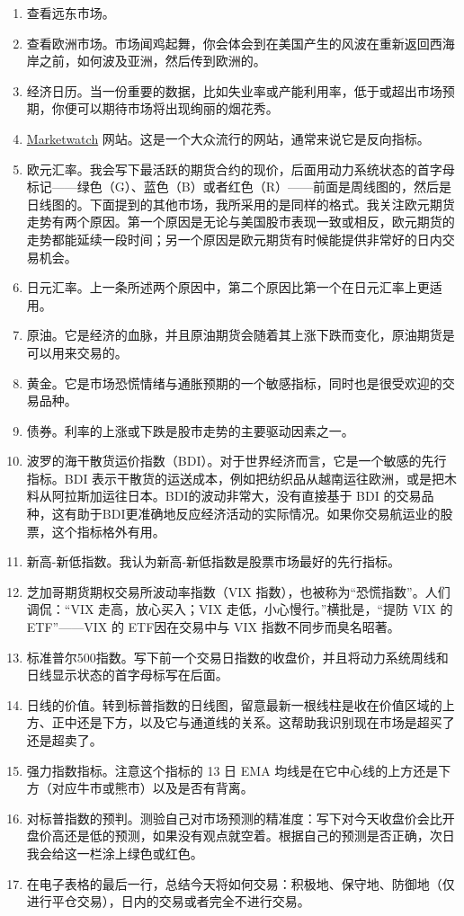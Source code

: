 \begin{enumerate}
    \item 查看远东市场。
    \item 查看欧洲市场。市场闻鸡起舞，你会体会到在美国产生的风波在重新返回西海岸之前，如何波及亚洲，然后传到欧洲的。
    \item 经济日历。当一份重要的数据，比如失业率或产能利用率，低于或超出市场预期，你便可以期待市场将出现绚丽的烟花秀。
    \item \href{https://www.marketwatch.com/}{Marketwatch} 网站。这是一个大众流行的网站，通常来说它是反向指标。
    \item 欧元汇率。我会写下最活跃的期货合约的现价，后面用动力系统状态的首字母标记——绿色（G）、蓝色（B）或者红色（R）——前面是周线图的，然后是日线图的。下面提到的其他市场，我所采用的是同样的格式。我关注欧元期货走势有两个原因。第一个原因是无论与美国股市表现一致或相反，欧元期货的走势都能延续一段时间；另一个原因是欧元期货有时候能提供非常好的日内交易机会。
    \item 日元汇率。上一条所述两个原因中，第二个原因比第一个在日元汇率上更适用。
    \item 原油。它是经济的血脉，并且原油期货会随着其上涨下跌而变化，原油期货是可以用来交易的。
    \item 黄金。它是市场恐慌情绪与通胀预期的一个敏感指标，同时也是很受欢迎的交易品种。
    \item 债券。利率的上涨或下跌是股市走势的主要驱动因素之一。
    \item 波罗的海干散货运价指数（BDI）。对于世界经济而言，它是一个敏感的先行指标。BDI 表示干散货的运送成本，例如把纺织品从越南运往欧洲，或是把木料从阿拉斯加运往日本。BDI的波动非常大，没有直接基于 BDI 的交易品种，这有助于BDI更准确地反应经济活动的实际情况。如果你交易航运业的股票，这个指标格外有用。
    \item 新高-新低指数。我认为新高-新低指数是股票市场最好的先行指标。
    \item 芝加哥期货期权交易所波动率指数（VIX 指数），也被称为“恐慌指数”。人们调侃：“VIX 走高，放心买入；VIX 走低，小心慢行。”横批是，“提防 VIX 的 ETF”——VIX 的 ETF因在交易中与 VIX 指数不同步而臭名昭著。
    \item 标准普尔500指数。写下前一个交易日指数的收盘价，并且将动力系统周线和日线显示状态的首字母标写在后面。
    \item 日线的价值。转到标普指数的日线图，留意最新一根线柱是收在价值区域的上方、正中还是下方，以及它与通道线的关系。这帮助我识别现在市场是超买了还是超卖了。
    \item 强力指数指标。注意这个指标的 13 日 EMA 均线是在它中心线的上方还是下方（对应牛市或熊市）以及是否有背离。
    \item 对标普指数的预判。测验自己对市场预测的精准度：写下对今天收盘价会比开盘价高还是低的预测，如果没有观点就空着。根据自己的预测是否正确，次日我会给这一栏涂上绿色或红色。
    \item 在电子表格的最后一行，总结今天将如何交易：积极地、保守地、防御地（仅进行平仓交易），日内的交易或者完全不进行交易。
\end{enumerate}
